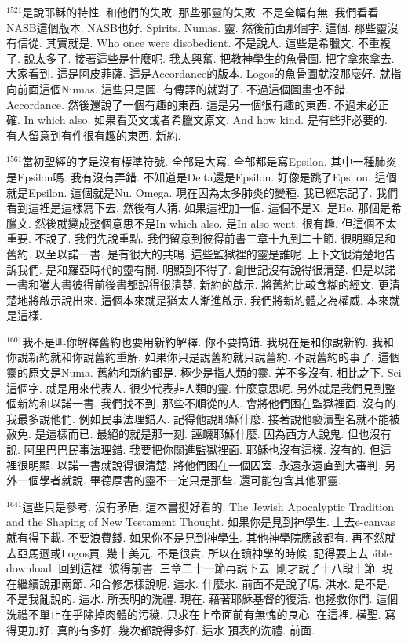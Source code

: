 \documentclass{book}
\begin{document}
$^{1521}$是說耶穌的特性.
和他們的失敗.
那些邪靈的失敗.
不是全幅有無.
我們看看NASB這個版本.
NASB也好.
Spirits.
Numas.
靈.
然後前面那個字.
這個.
那些靈沒有信從.
其實就是.
Who once were disobedient.
不是說人.
這些是希臘文.
不重複了.
說太多了.
接著這些是什麼呢.
我太興奮.
把教神學生的魚骨圖.
把字拿來拿去.
大家看到.
這是阿皮菲薩.
這是Accordance的版本.
Logos的魚骨圖就沒那麼好.
就指向前面這個Numas.
這些只是圖.
有傳譯的就對了.
不過這個圖畫也不錯.
Accordance.
然後還說了一個有趣的東西.
這是另一個很有趣的東西.
不過未必正確.
In which also.
如果看英文或者希臘文原文.
And how kind.
是有些非必要的.
有人留意到有件很有趣的東西.
新約.

$^{1561}$當初聖經的字是沒有標準符號.
全部是大寫.
全部都是寫Epsilon.
其中一種肺炎是Epsilon嗎.
我有沒有弄錯.
不知道是Delta還是Epsilon.
好像是跳了Epsilon.
這個就是Epsilon.
這個就是Nu.
Omega.
現在因為太多肺炎的變種.
我已經忘記了.
我們看到這裡是這樣寫下去.
然後有人猜.
如果這裡加一個.
這個不是X.
是He.
那個是希臘文.
然後就變成整個意思不是In which also.
是In also went.
很有趣.
但這個不太重要.
不說了.
我們先說重點.
我們留意到彼得前書三章十九到二十節.
很明顯是和舊約.
以至以諾一書.
是有很大的共鳴.
這些監獄裡的靈是誰呢.
上下文很清楚地告訴我們.
是和羅亞時代的靈有關.
明顯到不得了.
創世記沒有說得很清楚.
但是以諾一書和猶大書彼得前後書都說得很清楚.
新約的啟示.
將舊約比較含糊的經文.
更清楚地將啟示說出來.
這個本來就是猶太人漸進啟示.
我們將新約體之為權威.
本來就是這樣.

$^{1601}$我不是叫你解釋舊約也要用新約解釋.
你不要搞錯.
我現在是和你說新約.
我和你說新約就和你說舊約重解.
如果你只是說舊約就只說舊約.
不說舊約的事了.
這個靈的原文是Numa.
舊約和新約都是.
極少是指人類的靈.
差不多沒有.
相比之下.
Sei這個字.
就是用來代表人.
很少代表非人類的靈.
什麼意思呢.
另外就是我們見到整個新約和以諾一書.
我們找不到.
那些不順從的人.
會將他們困在監獄裡面.
沒有的.
我最多說他們.
例如民事法理錯人.
記得他說耶穌什麼.
接著說他褻瀆聖名就不能被赦免.
是這樣而已.
最絕的就是那一刻.
誣衊耶穌什麼.
因為西方人說鬼.
但也沒有說.
阿里巴巴民事法理錯.
我要把你關進監獄裡面.
耶穌也沒有這樣.
沒有的.
但這裡很明顯.
以諾一書就說得很清楚.
將他們困在一個囚室.
永遠永遠直到大審判.
另外一個學者就說.
畢德厚書的靈不一定只是那些.
還可能包含其他邪靈.

$^{1641}$這些只是參考.
沒有矛盾.
這本書挺好看的.
The Jewish Apocalyptic Tradition and the Shaping of New Testament Thought.
如果你是見到神學生.
上去e-canvas就有得下載.
不要浪費錢.
如果你不是見到神學生.
其他神學院應該都有.
再不然就去亞馬遜或Logos買.
幾十美元.
不是很貴.
所以在讀神學的時候.
記得要上去bible download.
回到這裡.
彼得前書.
三章二十一節再說下去.
剛才說了十八段十節.
現在繼續說那兩節.
和合修怎樣說呢.
這水.
什麼水.
前面不是說了嗎.
洪水.
是不是.
不是我亂說的.
這水.
所表明的洗禮.
現在.
藉著耶穌基督的復活.
也拯救你們.
這個洗禮不單止在乎除掉肉體的污穢.
只求在上帝面前有無愧的良心.
在這裡.
橫聖.
寫得更加好.
真的有多好.
幾次都說得多好.
這水 預表的洗禮.
前面.
\end{document}
